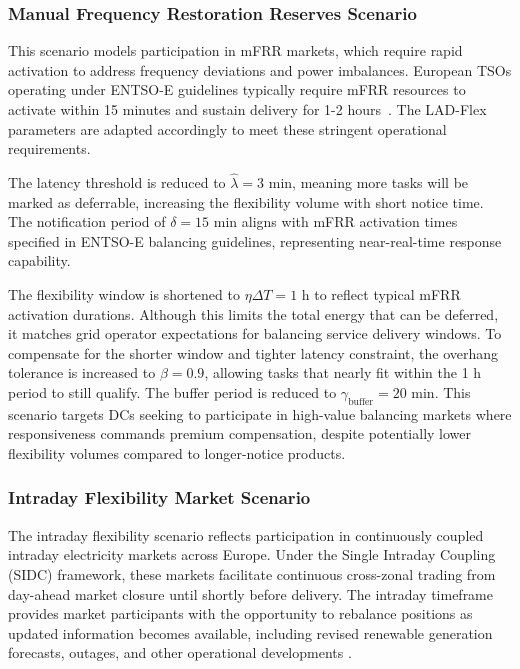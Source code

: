 \documentclass[preprint,12pt]{elsarticle}
\begin{document}
\subsubsection{Manual Frequency Restoration Reserves Scenario}

This scenario models participation in mFRR markets, which require rapid activation to address frequency deviations and power imbalances. European TSOs operating under ENTSO-E guidelines typically require mFRR resources to activate within 15 minutes and sustain delivery for 1-2 hours~\cite{ENTSOE_MARI_IG_v1_7}. The LAD-Flex parameters are adapted accordingly to meet these stringent operational requirements.

The latency threshold is reduced to $\hat{\lambda} = 3$ min, meaning more tasks will be marked as deferrable, increasing the flexibility volume with short notice time. The notification period of $\delta = 15$ min aligns with mFRR activation times specified in ENTSO-E balancing guidelines, representing near-real-time response capability.

The flexibility window is shortened to $\eta\Delta T = 1$ h to reflect typical mFRR activation durations. Although this limits the total energy that can be deferred, it matches grid operator expectations for balancing service delivery windows. To compensate for the shorter window and tighter latency constraint, the overhang tolerance is increased to $\beta = 0.9$, allowing tasks that nearly fit within the 1 h period to still qualify. The buffer period is reduced to $\gamma_{\text{buffer}} = 20$ min. This scenario targets DCs seeking to participate in high-value balancing markets where responsiveness commands premium compensation, despite potentially lower flexibility volumes compared to longer-notice products.

\subsubsection{Intraday Flexibility Market Scenario}

The intraday flexibility scenario reflects participation in continuously coupled intraday electricity markets across Europe. Under the Single Intraday Coupling (SIDC) framework, these markets facilitate continuous cross-zonal trading from day-ahead market closure until shortly before delivery. The intraday timeframe provides market participants with the opportunity to rebalance positions as updated information becomes available, including revised renewable generation forecasts, outages, and other operational developments \cite{ENTSOE_Market_Report_2024}.
\end{document}
